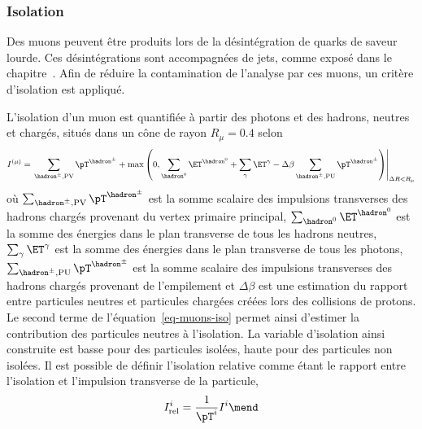\subsubsection{Isolation}\label{chapter-HTT_analysis-section-objects-muons-iso}
Des muons peuvent être produits lors de la désintégration de quarks de saveur lourde.
Ces désintégrations sont accompagnées de jets, comme exposé dans le chapitre~.
Afin de réduire la contamination de l'analyse par ces muons, un critère d'isolation est appliqué.
\par
L'isolation d'un muon est quantifiée à partir des photons et des hadrons, neutres et chargés, situés dans un cône de rayon $R_\mu=\num{0.4}$ selon
\begin{equation}
I^{(\mu)}
=
\left.
\sum_{\hadron^\pm,\text{PV}} \pT^{\hadron^\pm}
+
\max\left(
0
,
\sum_{\hadron^0}\ET^{\hadron^0}
+
\sum_{\gamma}\ET^{\gamma}
- \Delta\beta
\sum_{\hadron^\pm,\text{PU}} \pT^{\hadron^\pm}
\right)
\right|_{\Delta R < R_\mu}
\label{eq-muons-iso}
\end{equation}
où
$\sum_{\hadron^\pm,\text{PV}} \pT^{\hadron^\pm}$ est la somme scalaire des impulsions transverses des hadrons chargés provenant du vertex primaire principal,
$\sum_{\hadron^0}\ET^{\hadron^0}$ est la somme des énergies dans le plan transverse de tous les hadrons neutres,
$\sum_{\gamma}\ET^{\gamma}$ est la somme des énergies dans le plan transverse de tous les photons,
$\sum_{\hadron^\pm,\text{PU}} \pT^{\hadron^\pm}$  est la somme scalaire des impulsions transverses des hadrons chargés provenant de l'empilement et
$\Delta\beta$ est une estimation du rapport entre particules neutres et particules chargées créées lors des collisions de protons.
Le second terme de l'équation~\eqref{eq-muons-iso} permet ainsi d'estimer la contribution des particules neutres à l'isolation.
La variable d'isolation ainsi construite est basse pour des particules isolées, haute pour des particules non isolées.
Il est possible de définir l'isolation relative comme étant le rapport entre l'isolation et l'impulsion transverse de la particule,
\begin{equation}
I_\text{rel}^{i}
=
\frac{1}{\pT^{i}}
I^{i}
\mend
\label{eq-muons-reliso}
\end{equation}